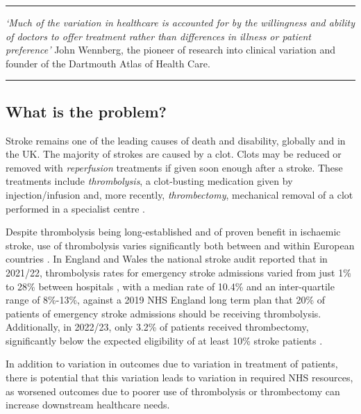 

\vspace{5mm}
\hrule
\textit{`Much of the variation in healthcare is accounted for by the willingness and ability of doctors to offer treatment rather than differences in illness or patient preference'} John Wennberg, the pioneer of research into clinical variation and founder of the Dartmouth Atlas of Health Care.
\vspace{2mm}
\hrule

\subsection*{What is the problem?}

Stroke remains one of the leading causes of death and disability, globally and in the UK. The majority of strokes are caused by a clot. Clots may be reduced or removed with \textit{reperfusion} treatments if given soon enough after a stroke. These treatments include \textit{thrombolysis}, a clot-busting medication given by injection/infusion \cite{emberson_effect_2014} and, more recently, \textit{thrombectomy}, mechanical removal of a clot performed in a specialist centre \cite{fransen_time_2016}.

Despite thrombolysis being long-established and of proven benefit in ischaemic stroke, use of thrombolysis varies significantly both between and within European countries \cite{aguiar_de_sousa_access_2019}. In England and Wales the national stroke audit reported that in 2021/22, thrombolysis rates for emergency stroke admissions varied from just 1\% to 28\% between hospitals \cite{sentinel_national_stroke_audit_programme_ssnap_2022}, with a median rate of 10.4\% and an inter-quartile range of 8\%-13\%, against a 2019 NHS England long term plan that 20\% of patients of emergency stroke admissions should be receiving thrombolysis. Additionally, in 2022/23, only 3.2\% of patients received thrombectomy, significantly below the expected eligibility of at least 10\% stroke patients \cite{mcmeekin_updating_2021}. 

In addition to variation in outcomes due to variation in treatment of patients, there is potential that this variation leads to variation in required NHS resources, as worsened outcomes due to poorer use of thrombolysis or thrombectomy can increase downstream healthcare needs.

